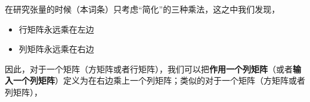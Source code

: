 在研究张量的时候（本词条）只考虑“简化”的三种乘法，这之中我们发现，
\begin{itemize}
\item 行矩阵永远乘在左边
\item 列矩阵永远乘在右边
\end{itemize}
因此，对于一个矩阵（方矩阵或者行矩阵），我们可以把\textbf{作用一个列矩阵}（或者\textbf{输入一个列矩阵}）定义为在右边乘上一个列矩阵；类似的对于一个矩阵（方矩阵或者列矩阵），






